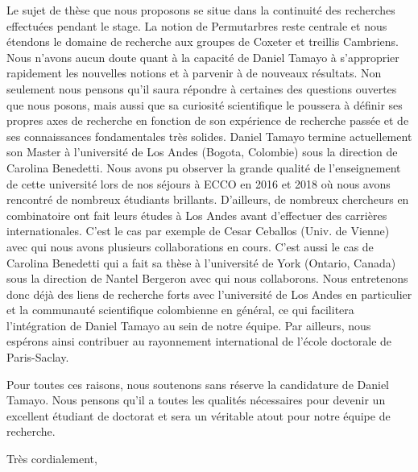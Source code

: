 \documentclass[11pt,a4paper]{letter} %
\begin{document}
\begin{letter}
Le sujet de thèse que nous proposons se situe dans la continuité des recherches effectuées pendant le stage. La notion de Permutarbres reste centrale et nous étendons le domaine de recherche aux groupes de Coxeter et treillis Cambriens. Nous n'avons aucun doute quant à la capacité de Daniel Tamayo à s'approprier rapidement les nouvelles notions et à parvenir à de nouveaux résultats. Non seulement nous pensons qu'il saura répondre à certaines des questions ouvertes que nous posons, mais aussi que sa curiosité scientifique le poussera à définir ses propres axes de recherche en fonction de son expérience de recherche passée et de ses connaissances fondamentales très solides. Daniel Tamayo termine actuellement son Master à l'université de Los Andes (Bogota, Colombie) sous la direction de Carolina Benedetti. Nous avons pu observer la grande qualité de l'enseignement de cette université lors de nos séjours à ECCO en 2016 et 2018 où nous avons rencontré de nombreux étudiants brillants. D'ailleurs, de nombreux chercheurs en combinatoire ont fait leurs études à Los Andes avant d'effectuer des carrières internationales. C'est le cas par exemple de Cesar Ceballos (Univ. de Vienne) avec qui nous avons plusieurs collaborations en cours. C'est aussi le cas de Carolina Benedetti qui a fait sa thèse à l'université de York (Ontario, Canada) sous la direction de Nantel Bergeron avec qui nous collaborons. Nous entretenons donc déjà des liens de recherche forts avec l'université de Los Andes en particulier et la communauté scientifique colombienne en général, ce qui facilitera l'intégration de Daniel Tamayo au sein de notre équipe. Par ailleurs, nous espérons ainsi contribuer au rayonnement international de l'école doctorale de Paris-Saclay. 

Pour toutes ces raisons, nous soutenons sans réserve la candidature de Daniel Tamayo. Nous pensons qu'il a toutes les qualités nécessaires pour devenir un excellent étudiant de doctorat et sera un véritable atout pour notre équipe de recherche.

 

\closing{Très cordialement,}


\end{letter}
\end{document}
